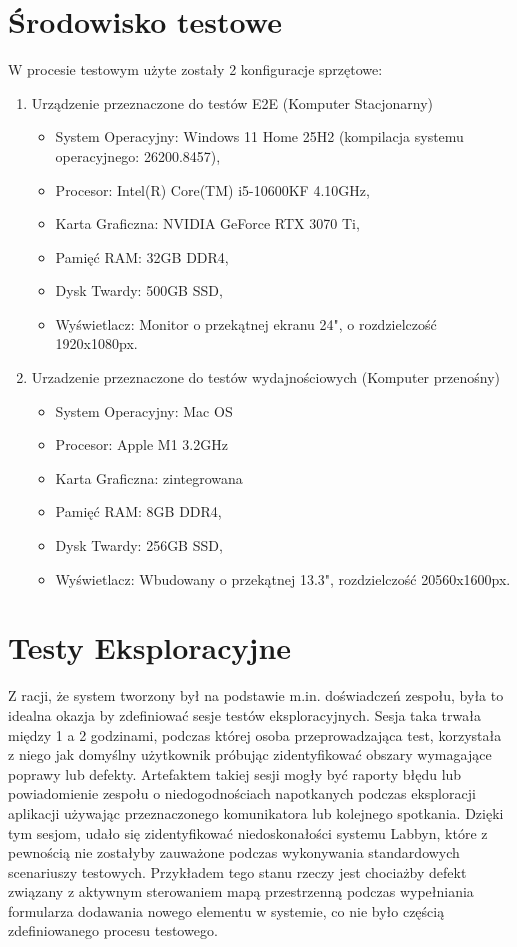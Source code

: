 \section{Środowisko testowe}
\par
W procesie testowym użyte zostały 2 konfiguracje sprzętowe:
\begin{enumerate}
    \item Urządzenie przeznaczone do testów E2E (Komputer Stacjonarny)
    \begin{itemize}
        \item System Operacyjny: Windows 11 Home 25H2 (kompilacja systemu operacyjnego: 26200.8457),
        \item Procesor: Intel(R) Core(TM) i5-10600KF 4.10GHz,
        \item Karta Graficzna: NVIDIA GeForce RTX 3070 Ti,
        \item Pamięć RAM: 32GB DDR4,
        \item Dysk Twardy: 500GB SSD,
        \item Wyświetlacz: Monitor o przekątnej ekranu 24", o rozdzielczość 1920x1080px.
    \end{itemize}
    \item Urzadzenie przeznaczone do testów wydajnościowych (Komputer przenośny)
    \begin{itemize}
        \item System Operacyjny: Mac OS
        \item Procesor: Apple M1 3.2GHz
        \item Karta Graficzna: zintegrowana
        \item Pamięć RAM: 8GB DDR4,
        \item Dysk Twardy: 256GB SSD,
        \item Wyświetlacz: Wbudowany o przekątnej 13.3", rozdzielczość 20560x1600px.
    \end{itemize}
\end{enumerate}

\section{Testy Eksploracyjne}
\par
Z racji, że system tworzony był na podstawie m.in. doświadczeń zespołu, była to idealna okazja by zdefiniować sesje testów eksploracyjnych.
Sesja taka trwała między 1 a 2 godzinami, podczas której osoba przeprowadzająca test, korzystała z niego jak domyślny użytkownik próbując zidentyfikować obszary wymagające poprawy lub defekty.
Artefaktem takiej sesji mogły być raporty błędu lub powiadomienie zespołu o niedogodnościach napotkanych podczas eksploracji aplikacji używając przeznaczonego komunikatora lub kolejnego spotkania.
Dzięki tym sesjom, udało się zidentyfikować niedoskonałości systemu \gls{Labbyn}, które z pewnością nie zostałyby zauważone podczas wykonywania standardowych scenariuszy testowych.
Przykładem tego stanu rzeczy jest chociażby defekt związany z aktywnym sterowaniem mapą przestrzenną podczas wypełniania formularza dodawania nowego elementu w systemie, co nie było częścią zdefiniowanego procesu testowego.

